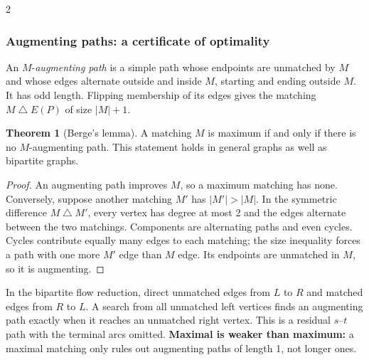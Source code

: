 \documentclass[10pt]{article}
\theoremstyle{definition}
\newtheorem{theorem}[definition]{Theorem}
\begin{document}
\begin{multicols*}{2}
\subsubsection*{Augmenting paths: a certificate of optimality}
An $M$-\emph{augmenting path} is a simple path whose endpoints are unmatched
by $M$ and whose edges alternate outside and inside $M$, starting and ending
outside $M$. It has odd length. Flipping membership of its edges gives the
matching $M\mathbin{\triangle}E(P)$ of size $|M|+1$.
\begin{theorem}[Berge's lemma]\label{nf:berge}
A matching $M$ is maximum if and only if there is no $M$-augmenting path.
This statement holds in general graphs as well as bipartite graphs.
\end{theorem}
\begin{proof}
An augmenting path improves $M$, so a maximum matching has none.
Conversely, suppose another matching $M'$ has $|M'|>|M|$. In the symmetric
difference $M\mathbin{\triangle}M'$, every vertex has degree at most 2 and
the edges alternate between the two matchings. Components are alternating
paths and even cycles. Cycles contribute equally many edges to each
matching; the size inequality forces a path with one more $M'$ edge than
$M$ edge. Its endpoints are unmatched in $M$, so it is augmenting.
\end{proof}
In the bipartite flow reduction, direct unmatched edges from $L$ to $R$ and
matched edges from $R$ to $L$. A search from all unmatched left vertices
finds an augmenting path exactly when it reaches an unmatched right vertex.
This is a residual $s$--$t$ path with the terminal arcs omitted.
\textbf{Maximal is weaker than maximum:} a maximal matching only rules out
augmenting paths of length 1, not longer ones.


\end{multicols*}
\end{document}

